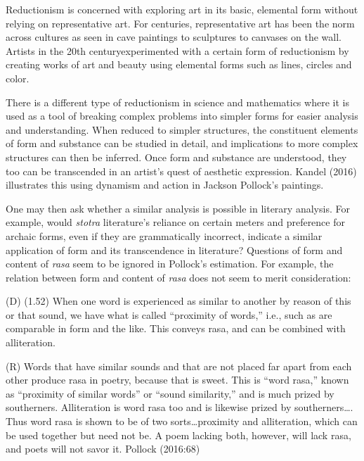 Reductionism is concerned with exploring art in its basic, elemental form without relying on representative art. For centuries, representative art has been the norm across cultures as seen in cave paintings to sculptures to canvases on the wall. Artists in the 20th century\break experimented with a certain form of reductionism by creating works of art and beauty using elemental forms such as lines, circles and color. 


There is a different type of reductionism in science and mathematics where it is used as a tool of breaking complex problems into simpler forms for easier analysis and understanding. When reduced to simpler structures, the constituent elements of form and substance can be studied in detail, and implications to more complex structures can then be inferred. Once form and substance are understood, they too can be transcended in an artist’s quest of aesthetic expression. Kandel (2016) illustrates this using dynamism and action in Jackson Pollock’s paintings. 

One may then ask whether a similar analysis is possible in literary analysis. For example, would \textsl{stotra} literature’s reliance on certain meters and preference for archaic forms, even if they are grammatically incorrect, indicate a similar application of form and its transcendence in literature? Questions of form and content of \textsl{rasa} seem to be ignored in Pollock’s estimation. For example, the relation between form and content of \textsl{rasa} does not seem to merit consideration:

\begin{myquote}
(D) (1.52) When one word is experienced as similar to another by reason of this or that sound, we have what is called “proximity of words,” i.e., such as are comparable in form and the like. This conveys rasa, and can be combined with alliteration.

(R) Words that have similar sounds and that are not placed far apart from each other produce rasa in poetry, because that is sweet. This is “word rasa,” known as “proximity of similar words” or “sound similarity,” and is much prized by southerners. Alliteration is word rasa too and is likewise prized by southerners…. Thus word rasa is shown to be of two sorts…proximity and alliteration, which can be used together but need not be. A poem lacking both, however, will lack rasa, and poets will not savor it.
\hfill Pollock (2016:68)
\end{myquote}

